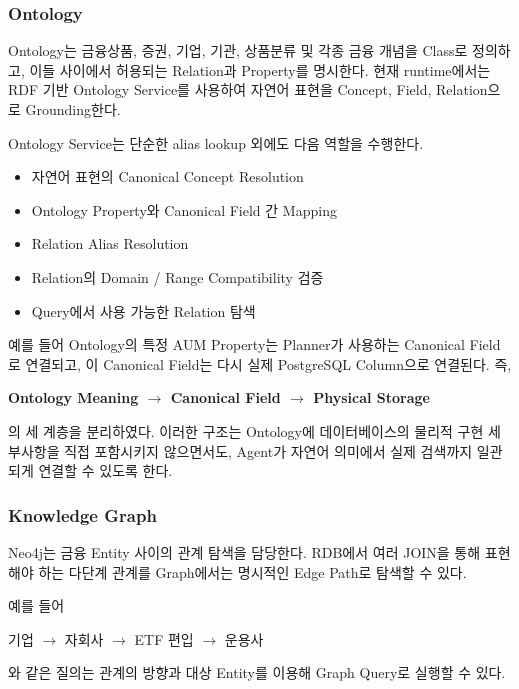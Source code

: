 \documentclass[11pt,a4paper]{article}
\begin{document}
\subsubsection{Ontology}

Ontology는 금융상품, 증권, 기업, 기관,
상품분류 및 각종 금융 개념을 Class로 정의하고,
이들 사이에서 허용되는 Relation과 Property를 명시한다.
현재 runtime에서는 RDF 기반 Ontology Service를 사용하여
자연어 표현을 Concept, Field, Relation으로 Grounding한다.

Ontology Service는 단순한 alias lookup 외에도
다음 역할을 수행한다.

\begin{itemize}
    \item 자연어 표현의 Canonical Concept Resolution
    \item Ontology Property와 Canonical Field 간 Mapping
    \item Relation Alias Resolution
    \item Relation의 Domain / Range Compatibility 검증
    \item Query에서 사용 가능한 Relation 탐색
\end{itemize}

예를 들어 Ontology의 특정 AUM Property는
Planner가 사용하는 Canonical Field로 연결되고,
이 Canonical Field는 다시 실제 PostgreSQL Column으로 연결된다.
즉,

\begin{center}
\textbf{Ontology Meaning
$\rightarrow$
Canonical Field
$\rightarrow$
Physical Storage}
\end{center}

의 세 계층을 분리하였다.
이러한 구조는 Ontology에 데이터베이스의 물리적 구현 세부사항을
직접 포함시키지 않으면서도,
Agent가 자연어 의미에서 실제 검색까지 일관되게 연결할 수 있도록 한다.

\subsubsection{Knowledge Graph}

Neo4j는 금융 Entity 사이의 관계 탐색을 담당한다.
RDB에서 여러 JOIN을 통해 표현해야 하는 다단계 관계를
Graph에서는 명시적인 Edge Path로 탐색할 수 있다.

예를 들어

\begin{center}
기업
$\rightarrow$
자회사
$\rightarrow$
ETF 편입
$\rightarrow$
운용사
\end{center}

와 같은 질의는 관계의 방향과 대상 Entity를 이용해
Graph Query로 실행할 수 있다.
\end{document}
